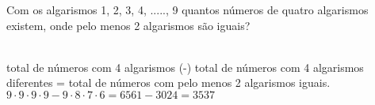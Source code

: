 \begin{ex}
 	Com os algarismos 1, 2, 3, 4, ....., 9 quantos números de quatro algarismos existem, onde pelo menos 2 algarismos são iguais?
 	  \begin{sol}
 	     \phantom{A}  \\
 	   total de números com 4 algarismos   (-) total de números com 4 algarismos diferentes = total de números com pelo menos 2 algarismos iguais. \\
 	   $9\cdot9\cdot9\cdot9 - 9\cdot8\cdot7\cdot6 = 6561-3024=3537$
 	  \end{sol}
\end{ex}